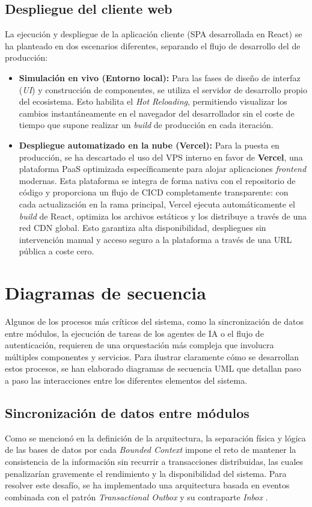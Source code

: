 \subsection{Despliegue del cliente web}
La ejecución y despliegue de la aplicación cliente (\ac{SPA} desarrollada en React) se ha planteado en dos escenarios diferentes, separando el flujo de desarrollo del de producción:
\begin{itemize}
    \item \textbf{Simulación en vivo (Entorno local):} Para las fases de diseño de interfaz (\emph{UI}) y construcción de componentes, se utiliza el servidor de desarrollo propio del ecosistema. Esto habilita el \emph{Hot Reloading}, permitiendo visualizar los cambios instantáneamente en el navegador del desarrollador sin el coste de tiempo que supone realizar un \emph{build} de producción en cada iteración.
    \item \textbf{Despliegue automatizado en la nube (Vercel):} Para la puesta en producción, se ha descartado el uso del \ac{VPS} interno en favor de \textbf{Vercel}, una plataforma \ac{PaaS} optimizada específicamente para alojar aplicaciones \emph{frontend} modernas. Esta plataforma se integra de forma nativa con el repositorio de código y proporciona un flujo de \ac{CICD} completamente transparente: con cada actualización en la rama principal, Vercel ejecuta automáticamente el \emph{build} de React, optimiza los archivos estáticos y los distribuye a través de una red \ac{CDN} global. Esto garantiza alta disponibilidad, despliegues sin intervención manual y acceso seguro a la plataforma a través de una URL pública a coste cero.
\end{itemize}


\section{Diagramas de secuencia}
Algunos de los procesos más críticos del sistema, como la sincronización de datos entre módulos, la ejecución de tareas de los agentes de \ac{IA} o el flujo de autenticación, requieren de una orquestación más compleja que involucra múltiples componentes y servicios. Para ilustrar claramente cómo se desarrollan estos procesos, se han elaborado diagramas de secuencia \ac{UML} que detallan paso a paso las interacciones entre los diferentes elementos del sistema.

\subsection{Sincronización de datos entre módulos}
Como se mencionó en la definición de la arquitectura, la separación física y lógica de las bases de datos por cada \emph{Bounded Context} impone el reto de mantener la consistencia de la información sin recurrir a transacciones distribuidas, las cuales penalizarían gravemente el rendimiento y la disponibilidad del sistema. Para resolver este desafío, se ha implementado una arquitectura basada en eventos combinada con el patrón \emph{Transactional Outbox} y su contraparte \emph{Inbox} \cite{richardson2018microservices}.

